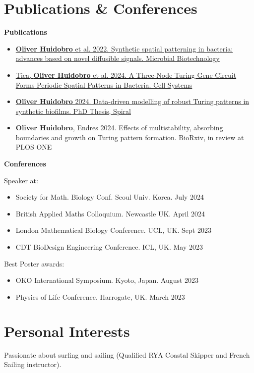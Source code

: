 \documentclass{ExpressiveResume}
\begin{document}
\section{Publications \& Conferences}
\noindent \faFile*[regular] \textbf{Publications}
\vspace{0.2cm}
\begin{itemize}
    \small \item  \href{https://doi.org/10.1111/1751-7915.13979}{\textbf{Oliver Huidobro} et al. 2022. Synthetic spatial patterning in bacteria: advances based on novel diffusible signals. Microbial Biotechnology \faLink}
    \small \item \href{https://papers.ssrn.com/sol3/papers.cfm?abstract_id=4733248}{Tica, \textbf{Oliver Huidobro} et al. 2024. A Three-Node Turing Gene Circuit Forms Periodic Spatial Patterns in Bacteria. Cell Systems \faLink}
    \small \item  \href{https://doi.org/10.25560/111289}{\textbf{Oliver Huidobro} 2024. Data-driven modelling of robust Turing patterns in synthetic biofilms. PhD Thesis, Spiral \faLink}
    \small \item \textbf{Oliver Huidobro}, Endres 2024. Effects of multistability, absorbing boundaries and growth on
    Turing pattern formation. BioRxiv, in review at PLOS ONE
\end{itemize}


\noindent\color{gray!50}\hdashrule[0.5ex]{\linewidth}{0.2pt}{1.5pt}
\vspace{0.2cm}

\noindent \faUsers \textbf{Conferences}

\noindent Speaker at:
\begin{itemize}
    \small \item Society for Math. Biology Conf. Seoul Univ. Korea. July 2024
    \small \item British Applied Maths Colloquium. Newcastle UK. April 2024
    \small \item London Mathematical Biology Conference. UCL, UK. Sept 2023
    \small \item CDT BioDesign Engineering Conference. ICL, UK. May 2023
\end{itemize}
\vspace{0.2cm}
Best Poster awards:
\begin{itemize}
    \small \item OKO International Symposium. Kyoto, Japan. August 2023
    \small \item Physics of Life Conference. Harrogate, UK. March 2023

\end{itemize}
\vspace{10pt}
\section{Personal Interests}
\noindent Passionate about surfing and sailing (Qualified RYA Coastal Skipper and French Sailing instructor).
\end{document}
